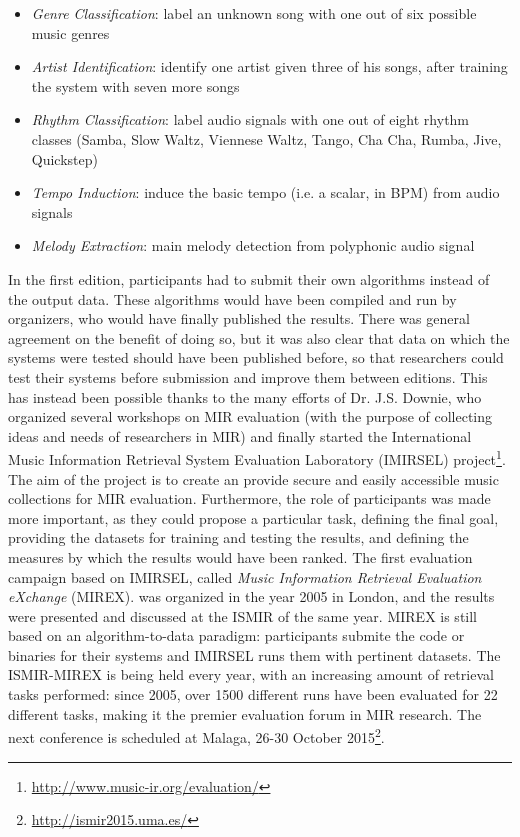 \begin{itemize}
\item \textit{Genre Classification}: label an unknown song with one out of six possible music genres
\item \textit{Artist Identification}: identify one artist given three of his songs, after training the system with seven more songs 
\item \textit{Rhythm Classification}: label audio signals with one out of eight rhythm classes (Samba, Slow Waltz, Viennese Waltz, Tango, Cha Cha, Rumba, Jive, Quickstep)
\item \textit{Tempo Induction}: induce the basic tempo (i.e. a scalar, in BPM) from audio signals
\item \textit{Melody Extraction}: main melody detection from polyphonic audio signal
\end{itemize}
In the first edition, participants had to submit their own algorithms instead of the output data. These algorithms would have been compiled and run by organizers, who would have finally published the results. There was general agreement on the benefit of doing so, but it was also clear that data on which the systems were tested should have been published before, so that researchers could test their systems before submission and improve them between editions. 
This has instead been possible thanks to the many efforts of Dr. J.S. Downie, who organized several workshops on MIR evaluation (with the purpose of collecting ideas and needs of researchers in MIR) and finally started the International Music Information Retrieval System Evaluation Laboratory (IMIRSEL) project\footnote{\url{http://www.music-ir.org/evaluation/}}. The aim of the project is to create an provide secure and easily accessible music collections for MIR evaluation. Furthermore, the role of participants was made more important, as they could propose a particular task, defining the final goal, providing the datasets for training and testing the results, and defining the measures by which the results would have been ranked. The first evaluation campaign based on IMIRSEL, called \textit{Music Information Retrieval Evaluation eXchange} (MIREX). was organized in the year 2005 in London, and the results were presented and discussed at the ISMIR of the same year. MIREX is still based on an algorithm-to-data paradigm: participants submite the code or binaries for their systems and IMIRSEL runs them with pertinent datasets. The ISMIR-MIREX is being held every year, with an increasing amount of retrieval tasks performed: since 2005, over 1500 different runs have been evaluated for 22 different tasks, making it the premier evaluation forum in MIR research. The next conference is scheduled at Malaga, 26-30 October 2015\footnote{\url{http://ismir2015.uma.es/}}. 
